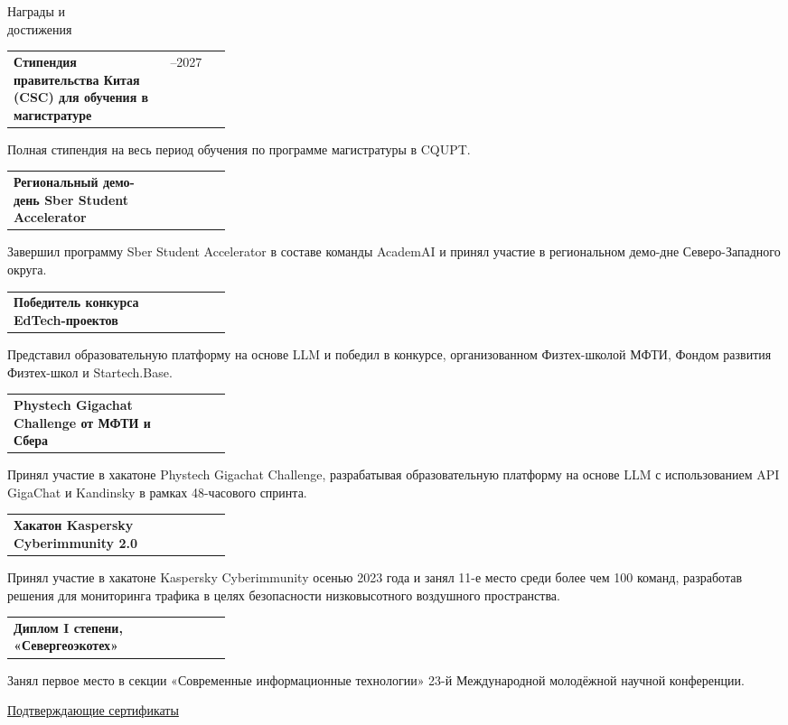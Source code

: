 \documentclass[11pt,a4paper]{article}
\makeatletter
\newcommand{\cvrow}[2]{%
  \noindent
  \begin{minipage}[t]{0.145\textwidth}
    \vspace{0pt}%
    \raggedright
    \fontsize{10.5}{12.5}\selectfont
    #1
  \end{minipage}%
  \hfill
  \begin{minipage}[t]{0.835\textwidth}
    \vspace{0pt}%
    #2
  \end{minipage}\par
}
\newcommand{\entry}[2]{%
  \begin{tabularx}{\linewidth}{@{}X >{\raggedleft\arraybackslash}p{0.28\linewidth}@{}}
    #1 & #2
  \end{tabularx}
}
\makeatother
\begin{document}
\cvrow{Награды и\\достижения}{%
  \entry
    {\textbf{Стипендия правительства Китая (CSC) для обучения в магистратуре}}
    {2024--2027}
  Полная стипендия на весь период обучения по программе магистратуры в CQUPT.

  \vspace{0.45em}
  \entry
    {\textbf{Региональный демо-день Sber Student Accelerator}}
    {2023}
  Завершил программу Sber Student Accelerator в составе команды AcademAI
  и принял участие в региональном демо-дне Северо-Западного округа.

  \vspace{0.45em}
  \entry
    {\textbf{Победитель конкурса EdTech-проектов}}
    {2023}
  Представил образовательную платформу на основе LLM и победил в конкурсе,
  организованном Физтех-школой МФТИ, Фондом развития Физтех-школ
  и Startech.Base.

  \vspace{0.45em}
  \entry
    {\textbf{Phystech Gigachat Challenge от МФТИ и Сбера}}
    {2023}
  Принял участие в хакатоне Phystech Gigachat Challenge, разрабатывая
  образовательную платформу на основе LLM с использованием API GigaChat
  и Kandinsky в рамках 48-часового спринта.

  \vspace{0.45em}
  \entry{\textbf{Хакатон Kaspersky Cyberimmunity 2.0}}
  {2023}
  Принял участие в хакатоне Kaspersky Cyberimmunity осенью 2023 года
  и занял 11-е место среди более чем 100 команд, разработав решения
  для мониторинга трафика в целях безопасности низковысотного воздушного пространства.

  \vspace{0.45em}
  \entry
    {\textbf{Диплом I степени, «Севергеоэкотех»}}
    {2022}
  Занял первое место в секции «Современные информационные технологии»
  23-й Международной молодёжной научной конференции.

  \vspace{0.3em}
  \href{https://iasenovets.github.io/files/certificates_selected_en_public_ready_v2.pdf}
       {\small Подтверждающие сертификаты}
}

\vspace{0.50em}
\end{document}
